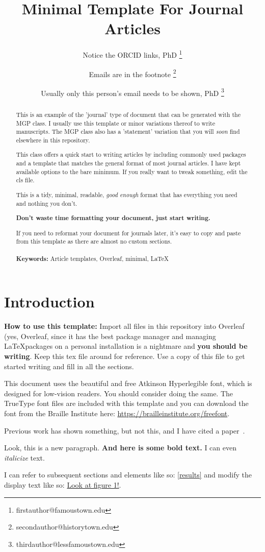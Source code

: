 \documentclass{getwriting}
\title{Minimal Template For Journal Articles}
\author[1,2]{Notice the ORCID links, PhD \orcidlink{xxxx-xxxx-xxxx-xxxx} \thanks{firstauthor@famoustown.edu}}
\author[3]{Emails are in the footnote \orcidlink{xxxx-xxxx-xxxx-xxxx} \thanks{secondauthor@historytown.edu}}
\author[1,3]{Usually only this person's email needs to be shown, PhD \orcidlink{xxxx-xxxx-xxxx-xxxx} \thanks{thirdauthor@lessfamoustown.edu}}
\affil[1]{\footnotesize Department of Science, University of Famoustown}
\affil[2]{\footnotesize Department of Mathematics, University of Lessfamoustown}
\affil[3]{\footnotesize Department of History, University of Historytown}
\begin{document}
\maketitle
\begin{abstract}
    This is an example of the 'journal' type of document that can be generated with the MGP class. I usually use this template or minor variations thereof to write manuscripts. The MGP class also has a 'statement' variation that you will \textit{soon} find elsewhere in this repository.
    \par
    This class offers a quick start to writing articles by including commonly used packages and a template that matches the general format of most journal articles. I have kept available options to the bare minimum. If you really want to tweak something, edit the cls file. 
    \par
    This is a tidy, minimal, readable, \textit{good enough} format that has everything you need and nothing you don't. 
    \par
    \textbf{Don't waste time formatting your document, just start writing.}
    \par
    If you need to reformat your document for journals later, it's easy to copy and paste from this template as there are almost no custom sections.
    \\\\
    \textbf{Keywords:} Article templates, Overleaf, minimal, \LaTeX
\end{abstract}
\section{Introduction}
\textbf{How to use this template: }Import all files in this repository into Overleaf (yes, Overleaf, since it has the best package manager and managing \LaTeX packages on a personal installation is a nightmare and \textbf{you should be writing}. Keep this tex file around for reference. Use a copy of this file to get started writing and fill in all the sections.
\par
This document uses the beautiful and free Atkinson Hyperlegible font, which is designed for low-vision readers. You should consider doing the same. The TrueType font files are included with this template and you can download the font from the Braille Institute here: \url{https://brailleinstitute.org/freefont}.
\par
Previous work has shown something, but not this, and I have cited a paper~\cite{scbonita}. 
\par
Look, this is a new paragraph. \textbf{And here is some bold text.} I can even \textit{italicize} text.
\par
I can refer to subsequent sections and elements like so: \hyperref[results]{\autoref{results}} and modify the display text like so: \hyperref[fig:figure1]{Look at figure 1!}.
\par
\end{document}
